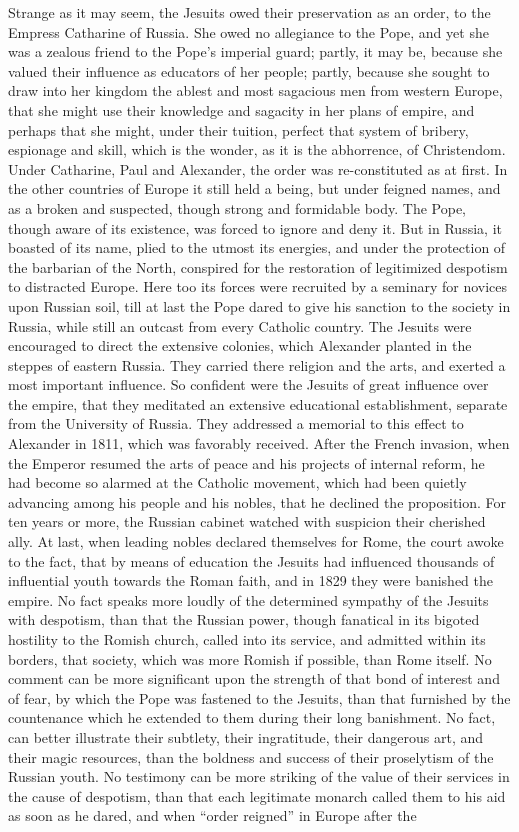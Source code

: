 \documentclass[]{book}
\begin{document}
Strange as it may seem, the Jesuits owed their preservation as an order, to the Empress Catharine of Russia. She owed no allegiance to the Pope, and yet she was a zealous friend to the Pope's imperial guard; partly, it may be, because she valued their influence as educators of her people; partly, because she sought to draw into her kingdom the ablest and most sagacious men from western Europe, that she might use their knowledge and sagacity in her plans of empire, and perhaps that she might, under their tuition, perfect that system of bribery, espionage and skill, which is the wonder, as it is the abhorrence, of Christendom. Under Catharine, Paul and Alexander, the order was re-constituted as at first. In the other countries of Europe it still held a being, but under feigned names, and as a broken and suspected, though strong and formidable body. The Pope, though aware of its existence, was forced to ignore and deny it. But in Russia, it boasted of its name, plied to the utmost its energies, and under the protection of the barbarian of the North, conspired for the restoration of legitimized despotism to distracted Europe. Here too its forces were recruited by a seminary for novices upon Russian soil, till at last the Pope dared to give his sanction to the society in Russia, while still an outcast from every Catholic country. The Jesuits were encouraged to direct the extensive colonies, which Alexander planted in the steppes of eastern Russia. They carried there religion and the arts, and exerted a most important influence. So confident were the Jesuits of great influence over the empire, that they meditated an extensive educational establishment, separate from the University of Russia. They addressed a memorial to this effect to Alexander in 1811, which was favorably received. After the French invasion, when the Emperor resumed the arts of peace and his projects of internal reform, he had become so alarmed at the Catholic movement, which had been quietly advancing among his people and his nobles, that he declined the proposition. For ten years or more, the Russian cabinet watched with suspicion their cherished ally. At last, when leading nobles declared themselves for Rome, the court awoke to the fact, that by means of education the Jesuits had influenced thousands of influential youth towards the Roman faith, and in 1829 they were banished the empire. No fact speaks more loudly of the determined sympathy of the Jesuits with despotism, than that the Russian power, though fanatical in its bigoted hostility to the Romish church, called into its service, and admitted within its borders, that society, which was more Romish if possible, than Rome itself. No comment can be more significant upon the strength of that bond of interest and of fear, by which the Pope was fastened to the Jesuits, than that furnished by the countenance which he extended to them during their long banishment. No fact, can better illustrate their subtlety, their ingratitude, their dangerous art, and their magic resources, than the boldness and success of their proselytism of the Russian youth. No testimony can be more striking of the value of their services in the cause of despotism, than that each legitimate monarch called them to his aid as soon as he dared, and when ``order reigned'' in Europe after the 
\end{document}
